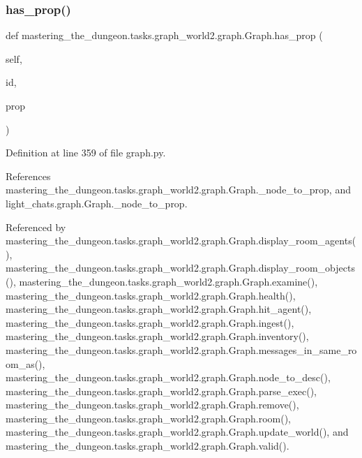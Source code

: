 \subsubsection{\texorpdfstring{has\+\_\+prop()}{has\_prop()}}
{\footnotesize\ttfamily def mastering\+\_\+the\+\_\+dungeon.\+tasks.\+graph\+\_\+world2.\+graph.\+Graph.\+has\+\_\+prop (\begin{DoxyParamCaption}\item[{}]{self,  }\item[{}]{id,  }\item[{}]{prop }\end{DoxyParamCaption})}



Definition at line 359 of file graph.\+py.



References mastering\+\_\+the\+\_\+dungeon.\+tasks.\+graph\+\_\+world2.\+graph.\+Graph.\+\_\+node\+\_\+to\+\_\+prop, and light\+\_\+chats.\+graph.\+Graph.\+\_\+node\+\_\+to\+\_\+prop.



Referenced by mastering\+\_\+the\+\_\+dungeon.\+tasks.\+graph\+\_\+world2.\+graph.\+Graph.\+display\+\_\+room\+\_\+agents(), mastering\+\_\+the\+\_\+dungeon.\+tasks.\+graph\+\_\+world2.\+graph.\+Graph.\+display\+\_\+room\+\_\+objects(), mastering\+\_\+the\+\_\+dungeon.\+tasks.\+graph\+\_\+world2.\+graph.\+Graph.\+examine(), mastering\+\_\+the\+\_\+dungeon.\+tasks.\+graph\+\_\+world2.\+graph.\+Graph.\+health(), mastering\+\_\+the\+\_\+dungeon.\+tasks.\+graph\+\_\+world2.\+graph.\+Graph.\+hit\+\_\+agent(), mastering\+\_\+the\+\_\+dungeon.\+tasks.\+graph\+\_\+world2.\+graph.\+Graph.\+ingest(), mastering\+\_\+the\+\_\+dungeon.\+tasks.\+graph\+\_\+world2.\+graph.\+Graph.\+inventory(), mastering\+\_\+the\+\_\+dungeon.\+tasks.\+graph\+\_\+world2.\+graph.\+Graph.\+messages\+\_\+in\+\_\+same\+\_\+room\+\_\+as(), mastering\+\_\+the\+\_\+dungeon.\+tasks.\+graph\+\_\+world2.\+graph.\+Graph.\+node\+\_\+to\+\_\+desc(), mastering\+\_\+the\+\_\+dungeon.\+tasks.\+graph\+\_\+world2.\+graph.\+Graph.\+parse\+\_\+exec(), mastering\+\_\+the\+\_\+dungeon.\+tasks.\+graph\+\_\+world2.\+graph.\+Graph.\+remove(), mastering\+\_\+the\+\_\+dungeon.\+tasks.\+graph\+\_\+world2.\+graph.\+Graph.\+room(), mastering\+\_\+the\+\_\+dungeon.\+tasks.\+graph\+\_\+world2.\+graph.\+Graph.\+update\+\_\+world(), and mastering\+\_\+the\+\_\+dungeon.\+tasks.\+graph\+\_\+world2.\+graph.\+Graph.\+valid().

